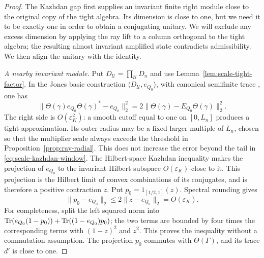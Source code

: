 \begin{proof}
The Kazhdan gap first supplies an invariant finite right module close to
the original copy of the tight algebra. Its dimension is close to one,
but we need it to be exactly one in order to obtain a conjugating
unitary. We will exclude any excess dimension by applying the ray lift
to a column orthogonal to the tight algebra; the resulting almost
invariant amplified state contradicts admissibility. We then align the
unitary with the identity.

\emph{A nearby invariant module.}
Put \(D_\mathcal U=\prod_{\mathcal U}D_n\) and use
Lemma~\ref{lem:scale-tight-factor}.  In the Jones basic
construction \(\langle D_\mathcal U,e_{Q_0}\rangle\), with
canonical semifinite trace \cite{Jones1983}, one has
\begin{equation}
 \|\Theta(\gamma)e_{Q_0}\Theta(\gamma)^*-e_{Q_0}\|_2^2
 =2\|\Theta(\gamma)-E_{Q_0}\Theta(\gamma)\|_2^2 .
 \label{eq:scale-jones-movement}
\end{equation}
The right side is \(O(\varepsilon_K^2)\): a smooth cutoff
equal to one on \([0,L_n]\) produces a tight approximation.
Its outer radius may be a fixed larger multiple of \(L_n\),
chosen so that the multiplier scale always exceeds the
threshold in Proposition~\ref{prop:ray-radial}.
This does not increase the error beyond the tail in
\eqref{eq:scale-kazhdan-window}.
The Hilbert-space Kazhdan inequality \cite{BHV2008} makes the projection of \(e_{Q_0}\) to the
invariant Hilbert subspace \(O(\varepsilon_K)\)-close to it.
This projection is the Hilbert limit of convex combinations
of its conjugates, and is therefore a positive contraction
\(z\).  Put \(p_0=1_{[1/2,1]}(z)\).  Spectral rounding gives
\begin{equation}
 \|p_0-e_{Q_0}\|_2\le2\|z-e_{Q_0}\|_2=O(\varepsilon_K).
 \label{eq:scale-rounded-projection}
\end{equation}
For completeness, split the left squared norm into
\(\operatorname{Tr}(e_{Q_0}(1-p_0))+\operatorname{Tr}((1-e_{Q_0})p_0)\);
the two terms are bounded by four times the corresponding
terms with \((1-z)^2\) and \(z^2\).  This proves the
inequality without a commutation assumption.
The projection \(p_0\) commutes with \(\Theta(\Gamma)\), and
its trace \(d'\) is close to one.


\end{proof}
